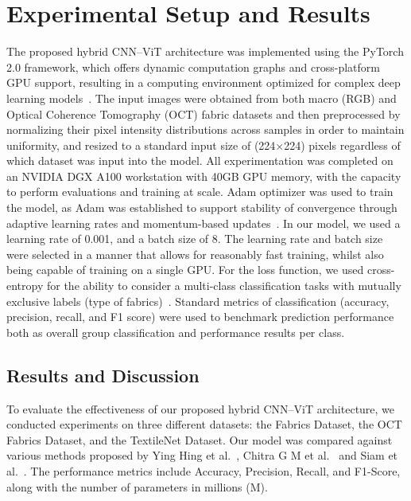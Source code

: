 \vspace{-1em}
\section{Experimental Setup and Results}

The proposed hybrid CNN–ViT architecture was implemented using the PyTorch 2.0 framework, which offers dynamic computation graphs and cross-platform GPU support, resulting in a computing environment optimized for complex deep learning models~\cite{paszke2019pytorch}. The input images were obtained from both macro (RGB) and Optical Coherence Tomography (OCT) fabric datasets and then preprocessed by normalizing their pixel intensity distributions across samples in order to maintain uniformity, and resized to a standard input size of (224×224) pixels regardless of which dataset was input into the model. All experimentation was completed on an NVIDIA DGX A100 workstation with 40GB GPU memory, with the capacity to perform evaluations and training at scale. Adam optimizer was used to train the model, as Adam was established to support stability of convergence through adaptive learning rates and momentum-based updates~\cite{kingma2014adam}. In our model, we used a learning rate of 0.001, and a batch size of 8. The learning rate and batch size were selected in a manner that allows for reasonably fast training, whilst also being capable of training on a single GPU. For the loss function, we used cross-entropy for the ability to consider a multi-class classification tasks with mutually exclusive labels (type of fabrics)~\cite{goodfellow2016deep}. Standard metrics of classification (accuracy, precision, recall, and F1 score) were used to benchmark prediction performance both as overall group classification and performance results per class.
\vspace{-1em}
\subsection{Results and Discussion}

To evaluate the effectiveness of our proposed hybrid CNN–ViT architecture, we conducted experiments on three different datasets: the Fabrics Dataset, the OCT Fabrics Dataset, and the TextileNet Dataset. Our model was compared against various methods proposed by Ying Hing et al.~\cite{hong2024research}, Chitra G M et al.~\cite{chitra2023fabric} and Siam et al.~\cite{siam2023textilenet}. The performance metrics include Accuracy, Precision, Recall, and F1-Score, along with the number of parameters in millions (M).

